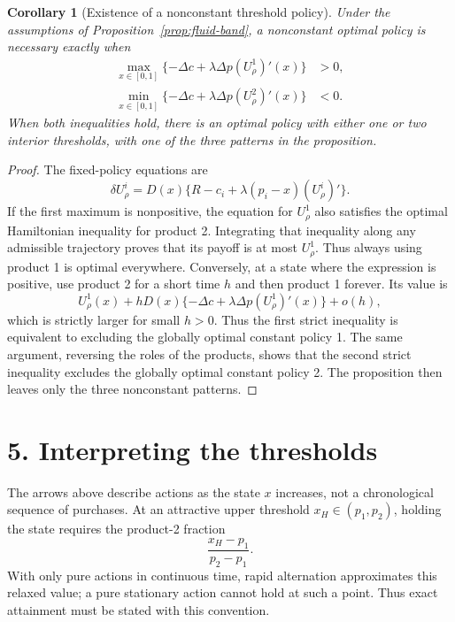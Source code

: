 \documentclass[11pt]{article}
\newtheorem{corollary}{Corollary}
\begin{document}
\begin{corollary}[Existence of a nonconstant threshold policy]
Under the assumptions of Proposition~\ref{prop:fluid-band}, a nonconstant
optimal policy is necessary exactly when
\begin{align*}
\max_{x\in[0,1]}\{-\Delta c+\lambda\Delta p(U^1_\rho)'(x)\}&>0,\\
\min_{x\in[0,1]}\{-\Delta c+\lambda\Delta p(U^2_\rho)'(x)\}&<0.
\end{align*}
When both inequalities hold, there is an optimal policy with either one
or two interior thresholds, with one of the three patterns in the proposition.
\end{corollary}
\begin{proof}
The fixed-policy equations are
\begin{equation*}
\delta U^i_\rho=D(x)\{R-c_i+\lambda(p_i-x)(U^i_\rho)'\}.
\end{equation*}
If the first maximum is nonpositive, the equation for $U^1_\rho$ also
satisfies the optimal Hamiltonian inequality for product 2. Integrating
that inequality along any admissible trajectory proves that its payoff
is at most $U^1_\rho$. Thus always using product 1 is optimal everywhere.
Conversely, at a state where the expression is positive, use product 2
for a short time $h$ and then product 1 forever. Its value is
\begin{equation*}
U^1_\rho(x)+hD(x)\{-\Delta c+\lambda\Delta p(U^1_\rho)'(x)\}+o(h),
\end{equation*}
which is strictly larger for small $h>0$. Thus the first strict inequality
is equivalent to excluding the globally optimal constant policy 1.
The same argument, reversing the roles of the products, shows that the
second strict inequality excludes the globally optimal constant policy 2.
The proposition then leaves only the three nonconstant patterns.
\end{proof}

\section*{5. Interpreting the thresholds}
The arrows above describe actions as the state $x$ increases, not a
chronological sequence of purchases. At an attractive upper threshold
$x_H\in(p_1,p_2)$, holding the state requires the product-2 fraction
\begin{equation*}
\frac{x_H-p_1}{p_2-p_1}.
\end{equation*}
With only pure actions in continuous time, rapid alternation approximates
this relaxed value; a pure stationary action cannot hold at such a point.
Thus exact attainment must be stated with this convention.
\end{document}
